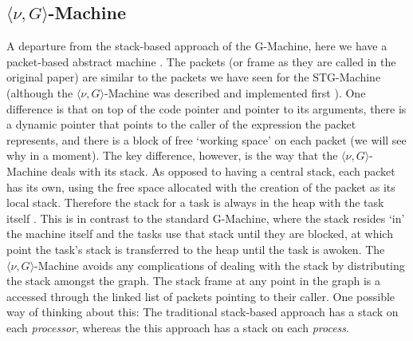  \subsection{$\langle \nu , G\rangle $-Machine}
    A departure from the stack-based approach of the G-Machine, here we have a
packet-based abstract machine \citep{vGMachine, Alice}.
    The packets (or frame as they are called in the
original paper) are similar to the packets we have seen for the STG-Machine
(although the $\langle \nu , G\rangle $-Machine was described and implemented
first \citep{vGMachine}). One difference is that on top of the code pointer and
pointer to its arguments, there is a dynamic pointer that points to the caller of
the expression the packet represents, and there is a block of free `working
space' on each packet (we will see why in a moment).
The key difference, however, is the way that the
$\langle \nu , G\rangle $-Machine deals with its stack.
As opposed to having a central stack, each packet has its own, using the free
space allocated with the creation of the packet as its local stack.
Therefore the stack for a task is always in
the heap with the task itself \citep{vGMachine}. This is in contrast to the standard
G-Machine, where the stack resides `in' the machine itself and the tasks use
that stack until they are blocked, at which point the task's stack is
transferred to the heap until the task is awoken.
    The $\langle \nu , G\rangle $-Machine avoids any complications of dealing
with the stack by distributing the stack amongst the graph. The stack frame at
any point in the graph is a accessed through the linked list of packets pointing
to their caller.
    One possible way of thinking about this: The traditional stack-based approach has a
stack on each \emph{processor}, whereas the this approach has a stack on
each \emph{process}.
